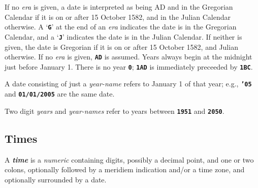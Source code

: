 \documentclass[12pt]{article}
\newcommand{\TT}[1]{{\tt \bfseries #1}}
\newcommand{\key}[1]{{\bf \em #1}\index{#1}}
\begin{document}
If no {\em era} is given, a date is interpreted as being AD and in the
Gregorian Calendar if it is on or after 15 October 1582, and
in the Julian Calendar otherwise.
A `\TT{G}' at the end of an {\em era} indicates the date is in the
Gregorian Calendar, and a `\TT{J}' indicates the date is in the Julian
Calendar.  If neither is given, the date is Gregorian if it is on
or after 15 October 1582, and Julian otherwise.  If no {\em era}
is given, \TT{AD} is assumed.  Years always begin at the midnight just
before January 1.  There is no year \TT{0}; \TT{1AD} is immediately preceeded
by \TT{1BC}.

A date consisting of just a {\em year-name} refers to January 1 of that
year; e.g., \TT{'05} and \TT{01/01/2005} are the same date.

Two digit {\em years} and {\em year-names} refer to years between
\TT{1951} and \TT{2050}.

\subsection{Times}
\label{TIME}

A \key{time} is a {\em numeric} containing digits, possibly a decimal
point, and one or two colons, optionally followed by a meridiem indication
and/or a time zone, and optionally surrounded by a date.
\end{document}

